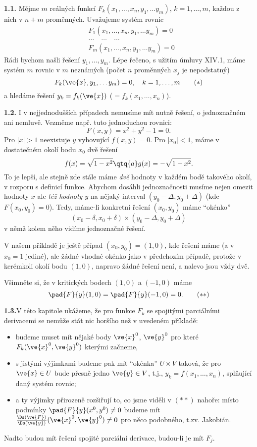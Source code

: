 \documentclass[12pt]{article}
\begin{document}
{{\bf 1.1.} Mějme $m$ reálných funkcí $F_k(x_1,\dots,x_n,y_1,\dots y_m)$, $k=1,\dots,m$, každou z nich v $n+m$ proměnných. Uvažujeme systém rovnic
$$
\begin{aligned}
&F_1(x_1,\dots,x_n,y_1,\dots y_m)=0\\
&\dots\quad\dots\quad\dots\\
&F_m(x_1,\dots,x_n,y_1,\dots y_m)=0
\end{aligned}
$$
Rádi bychom našli řešení $y_1,\dots,y_m$. Lépe řečeno, s užitím úmluvy XIV.1, máme systém  $m$ rovnic v $m$ neznámých (počet  $n$ proměnných $x_j$ je nepodstatný)
\begin{equation}
F_k(\ve{x},y_1,\dots y_m)=0, \quad k=1,\dots,m \tag{$*$}
\end{equation}
a hledáme řešení $y_k=f_k(\ve{x})$ ($=f_k(x_1,\dots,x_n)$).

\bigskip

{\bf 1.2.} I v nejjednodušších případech nemusíme mít nutně řešení, o jednoznačném ani nemluvě.
Vezměme např. tuto jednoduchou rovnici:
$$
F(x,y)=x^2+y^2-1=0.
$$ 
Pro $|x|>1$ neexistuje $y$ vyhovující $f(x,y)=0$. Pro $|x_0|<1$, 
 máme v dostatečném okolí bodu $x_0$ dvě řešení
$$
f(x)=\sqrt{1-x^2}\qtq{a}g(x)=-\sqrt{1-x^2}.
$$
To je lepší, ale stejně zde stále máme {\em dvě} hodnoty v každém bodě takového okolí,
v rozporu s definicí funkce. Abychom dosáhli jednoznačnosti musíme nejen omezit hodnoty 
 $x$ ale {\em též hodnoty $y$} 
na nějaký interval $(y_0-\Delta,y_0+\Delta)$ (kde $F(x_0,y_0)=0$). Tedy, 
máme-li konkretní řešení $(x_0,y_0)$ máme ``okénko''
$$
(x_0-\delta,x_0+\delta)\times(y_0-\Delta,y_0+\Delta)
$$
v němž kolem něho vidíme jednoznačné řešení.

V našem příkladě
je ještě případ $(x_0,y_0)=(1,0)$, kde řešení máme (a v $x_0=1$ jediné),
ale žádné vhodné okénko jako v předchozím případě, protože
v kerémkoli okolí bodu $(1,0)$,
napravo žádné řešení není, a nalevo jsou vždy dvě.

\smallskip

Všimněte si, že v kritických bodech $(1,0)$ a $(-1,0)$ máme
\begin{equation}
\pad{F}{y}(1,0)=\pad{F}{y}(-1,0)=0. \tag{$**$}
\end{equation}


\bigskip

{\bf 1.3.}V této kapitole ukážeme, že pro funkce $F_k$ se spojitými parciálními derivacemi se nemůže stát nic horšího než v uvedeném příkladě:
\begin{itemize}
\item budeme muset mít nějaké body $\ve{x}^0$, $\ve{y}^0$ pro které $F_k(\ve{x}^0,\ve{y}^0)$ kterými začneme,
\item s jistými výjimkami budeme pak mít ``okénka'' $U\times V$ taková, že pro $\ve{x}\in U$ bude přesně jedno $\ve{y}\in V$, t.j.,
$y_k=f(x_1,\dots,x_n)$, splňující daný systém rovnic;
\item a ty výjimky přirozeně rozšiřují to, co jsme viděli v $(**)$ nahoře: místo podmínky $\pad{F}{y}(x^0,y^0)\neq 0$ budeme mít
$\frac{\Ds(\ve{F})}{\Ds(\ve{y})}(\ve{x}^0,\ve{y}^0)\neq 0$ pro něco podobného, t.zv. Jakobián.
\end{itemize}
Nadto budou mít řešení spojité parciální derivace, budou-li je mít $F_j$.

}
\end{document}
